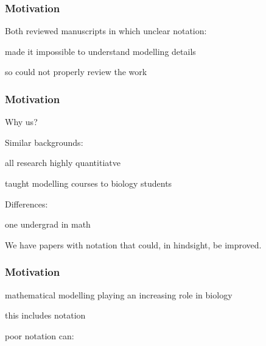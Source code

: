 
\begin{frame}
\frametitle{Motivation}

Both reviewed manuscripts in which unclear notation:
\bi
\item made it impossible to understand modelling details
\item {}
\item so could not properly review the work
\ei

\end{frame}


\begin{frame}
\frametitle{Motivation}

Why us?

\medskip

Similar backgrounds:
\bi
\item all research highly quantitiatve
\item {}
\item taught modelling courses to biology students
\ei

Differences:
\bi
\item one undergrad in math
\item {}
\ei

\medskip

We have papers with notation that could, in hindsight, be improved.

\end{frame}



\begin{frame}
\frametitle{Motivation}
\bi
\item mathematical modelling playing an increasing role in biology
\item {}
\item this includes notation
\item {}
\item poor notation can:
  \bi
  \item {}
  \item {}
  \item {}
  \item {}
  \ei
\ei
\end{frame}

